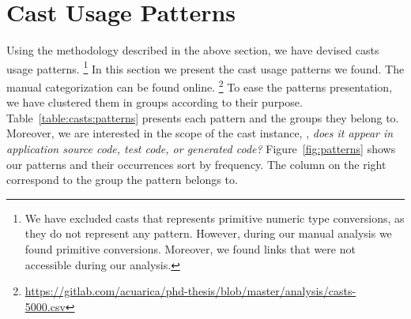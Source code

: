 
\newcommand{\castpatternsection}[1]{\noindent\textbf{#1.}}
\newcommand{\pname}[1]{\textsc{#1}}
\newcommand{\group}[1]{

\

\

{\noindent\Large\textsc{#1} Patterns}

\

\begin{figure}[ht!]
\centering
\texttt{[image: "analysis/table-patterns-5000-by-group-\#1"]}
\caption{Cast Patterns Occurrences}
\label{fig:group-patterns:#1}
\end{figure}

}

\newenvironment{pattern}[1]{
	\newcommand{\desc}{\castpatternsection{Description}}
	\newcommand{\instances}{\castpatternsection{Instances}}
	\newcommand{\detection}{\castpatternsection{Detection}}
	\newcommand{\discussion}{\castpatternsection{Discussion}}
	\newcommand{\related}{\castpatternsection{Related Patterns}}
    \newcommand{\thisp}{\textsc{#1}}
    \subsection{\pname{#1}}
    \label{pat:#1}
	\desc
}{}


\section{Cast Usage Patterns}
\label{sec:casts:patterns}

Using the methodology described in the above section, we have devised \npattern{} casts usage patterns.%
\footnote{We have excluded casts that represents primitive numeric type conversions, as they do not represent any pattern.
However, during our manual analysis we found \nprim{} primitive conversions.
Moreover, we found \nbrokenlinks{} links that were not accessible during our analysis.}
In this section we present the cast usage patterns we found.
The manual categorization can be found online.%
\footnote{\url{https://gitlab.com/acuarica/phd-thesis/blob/master/analysis/casts-5000.csv}}
To ease the patterns presentation, we have clustered them in \ngroup{} groups according to their purpose.
Table~\ref{table:casts:patterns} presents each pattern and the groups they belong to.
Moreover, we are interested in the scope of the cast instance, \ie, \emph{does it appear in application source code, test code, or generated code?}
Figure~\ref{fig:patterns} shows our patterns and their occurrences sort by frequency.
The column on the right correspond to the group the pattern belongs to.

